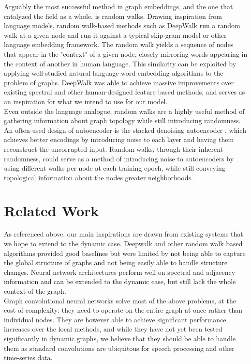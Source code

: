 \documentclass[12pt,twoside]{report}
\begin{document}
Arguably the most successful method in graph embeddings, and the one that catalyzed the field as a whole, is random walks. Drawing inspiration from language models, random walk-based methods such as DeepWalk \cite{perozzi2014deepwalk} run a random walk at a given node and run it against a typical skip-gram model or other language embedding framework. The random walk yields a sequence of nodes that appear in the "context" of a given node, closely mirroring words appearing in the context of another in human language. This similarity can be exploited by applying well-studied natural language word embedding algorithms to the problem of graphs. DeepWalk was able to achieve massive improvements over existing spectral and other human-designed feature based methods, and serves as an inspiration for what we intend to use for our  model. \\

Even outside the language analogue, random walks are a highly useful method of gathering information about graph topology while still introducing randomness. An often-used design of autoencoder is the stacked denoising autoencoder \cite{vincent2010stacked}, which achieves better encodings by introducing noise to each layer and having them reconstruct the uncorrupted input. Random walks, through their inherent randomness, could serve as a method of introducing noise to autoencoders by using different walks per node at each training epoch, while still conveying topological information about the nodes greater neighborhoods. \\

\section{Related Work}

As referenced above, our main inspirations are drawn from existing systems that we hope to extend to the dynamic case. Deepwalk and other random walk based algorithms provided good baselines but were limited by not being able to capture the global structure of graphs and not being easily able to handle structure changes. Neural network architectures perform well on spectral and adjacency information and can be extended to the dynamic case, but still lack the whole context of the graph. \\

Graph convolutional neural networks solve most of the above problems, at the cost of complexity: they need to operate on the entire graph at once rather than individual nodes. They are however able to achieve significant performance increases over the local methods, and while they have not yet been tested significantly in dynamic graphs, we believe that they should be able to handle them as standard convolutions are ubiquitous for speech processing and other time-series data. \\
\end{document}
